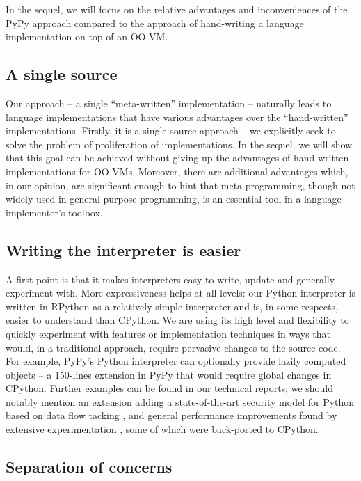 \documentclass{llncs}
\begin{document}
In the sequel, we will focus on the relative advantages and
inconveniences of the PyPy approach compared to the approach of
hand-writing a language implementation on top of an OO VM.


\subsection{A single source}

Our approach -- a single ``meta-written'' implementation -- naturally
leads to language implementations that have various advantages over the
``hand-written'' implementations.  Firstly, it is a single-source
approach -- we explicitly seek to solve the problem of proliferation of
implementations.  In the sequel, we will show that this goal can be
achieved without giving up the advantages of hand-written
implementations for OO VMs.  Moreover, there are additional advantages which,
in our opinion, are significant enough to hint that meta-programming,
though not widely used in general-purpose programming, is an essential
tool in a language implementer's toolbox.

\subsection{Writing the interpreter is easier}

A first point is that it makes interpreters easy to write, update and
generally experiment with.  More expressiveness helps at all levels: our
Python interpreter is written in RPython as a relatively simple
interpreter and is, in some respects, easier to understand than CPython.  We are
using its high level and flexibility to quickly experiment with features
or implementation techniques in ways that would, in a traditional
approach, require pervasive changes to the source code.  For example,
PyPy's Python interpreter can optionally provide lazily computed objects
-- a 150-lines extension in PyPy that would require global changes in
CPython.  Further examples can be found in our technical reports; we
should notably mention an extension adding a state-of-the-art security
model for Python based on data flow tacking \cite{D12.1}, and general
performance improvements found by extensive experimentation \cite{D06.1}, some
of which were back-ported to CPython.

\subsection{Separation of concerns}
\end{document}
